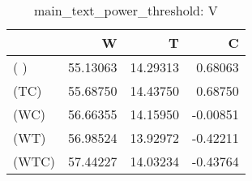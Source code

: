 \begin{table}
\centering
\caption{main_text_power_threshold: V}
\begin{tabular}{lrrr}
\toprule
{} &        W &        T &        C \\
\midrule
( )   & 55.13063 & 14.29313 &  0.68063 \\
(TC)  & 55.68750 & 14.43750 &  0.68750 \\
(WC)  & 56.66355 & 14.15950 & -0.00851 \\
(WT)  & 56.98524 & 13.92972 & -0.42211 \\
(WTC) & 57.44227 & 14.03234 & -0.43764 \\
\bottomrule
\end{tabular}
\end{table}
